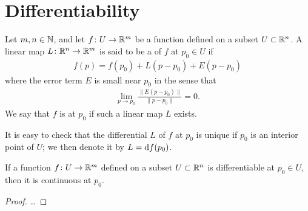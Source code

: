 \section{Differentiability}

\begin{definition}
  \label{def:differential}
  Let $m,n \in \mathbb{N}$, and
  let $f \colon U \to \mathbb{R}^m$ be a function
  defined on a subset $U \subset \mathbb{R}^n$.
  A linear map $L \colon \mathbb{R}^n \to \mathbb{R}^m$
  is said to be a  of $f$
  at $p_0 \in U$ if
  \begin{align*}
    f(p) = f(p_0) + L (p-p_0) + E(p-p_0)
  \end{align*}
  where the error term $E$ is small near $p_0$ in the sense that
  \begin{align*}
    \lim_{p \to p_0} \frac{\| E(p-p_0) \|}{\|p-p_0\|} = 0 .
  \end{align*}
  We say that $f$ is  at $p_0$ if such
  a linear map $L$ exists.

  It is easy to check that the differential $L$ of $f$ at $p_0$
  is unique if $p_0$ is an interior point of $U$;
  we then denote it by $L = \mathrm{d} f (p_0)$.
\end{definition}

\begin{lemma}
  \label{lem:differentiable_implies_continuous}
  If a function $f \colon U \to \mathbb{R}^m$
  defined on a subset $U \subset \mathbb{R}^n$ is differentiable
  at $p_0 \in U$, then it is continuous at $p_0$.
\end{lemma}
\begin{proof}
  \ldots
\end{proof}

